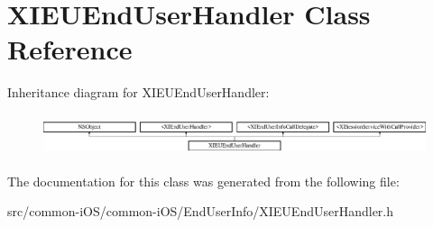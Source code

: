 \hypertarget{interface_x_i_e_u_end_user_handler}{}\section{X\+I\+E\+U\+End\+User\+Handler Class Reference}
\label{interface_x_i_e_u_end_user_handler}
Inheritance diagram for X\+I\+E\+U\+End\+User\+Handler\+:\begin{figure}[H]
\begin{center}
\leavevmode
\includegraphics[height=1.222707cm]{interface_x_i_e_u_end_user_handler}
\end{center}
\end{figure}


The documentation for this class was generated from the following file\+:\begin{DoxyCompactItemize}
\item 
src/common-\/i\+O\+S/common-\/i\+O\+S/\+End\+User\+Info/X\+I\+E\+U\+End\+User\+Handler.\+h\end{DoxyCompactItemize}
